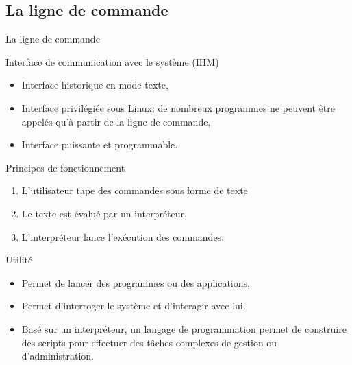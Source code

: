 \subsection{La ligne de commande}
\begin{frame}{La ligne de commande}
  \begin{block}{Interface de communication avec le système (IHM)}
    \begin{itemize}
    \item Interface historique en mode texte,
    \item Interface privilégiée sous Linux: de nombreux programmes ne
      peuvent être appelés qu'à partir de la ligne de commande,
    \item Interface puissante et programmable.
    \end{itemize}
  \end{block}
  \begin{block}{Principes de fonctionnement}
    \begin{enumerate}
    \item L'utilisateur tape des commandes sous forme de texte
    \item Le texte est évalué par un interpréteur,
    \item L'interpréteur lance l'exécution des commandes.
    \end{enumerate}
  \end{block}
  \begin{block}{Utilité}
    \begin{itemize}
    \item Permet de lancer des programmes ou des applications,
    \item Permet d'interroger le système et d'interagir avec lui.
    \item Basé sur un interpréteur, un langage de programmation permet
      de construire des scripts pour effectuer des tâches complexes de
      gestion ou d'administration.
    \end{itemize}
  \end{block}
\end{frame}

